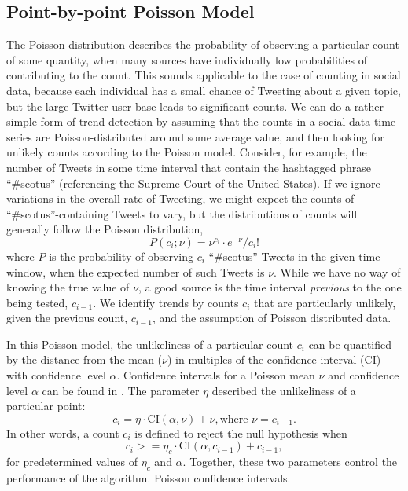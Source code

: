 \documentclass{article}
\begin{document}
\subsection{Point-by-point Poisson Model}
\label{pbppm}

The Poisson distribution describes the probability of observing a particular
count of some quantity, when many sources have individually low probabilities
of contributing to the count. This sounds applicable to the case of counting in
social data, because each individual has a small chance of Tweeting about a
given topic, but the large Twitter user base leads to significant counts. We
can do a rather simple form of trend detection by assuming that the counts in a
social data time series are Poisson-distributed around some average value, and
then looking for unlikely counts according to the Poisson model. Consider, for example,
the number of Tweets in some time interval that contain the hashtagged phrase ``\#scotus''
(referencing the Supreme Court of the United States).
If we ignore variations in the overall rate of Tweeting, we might expect the
counts of ``\#scotus''-containing Tweets to vary, but the distributions of counts
will generally follow the Poisson distribution,
\begin{equation}
    P(c_i;\nu) = \nu^{c_i}\cdot e^{-\nu} / c_i!
\end{equation}
where $P$ is the probability of observing $c_i$ ``\#scotus'' Tweets in the given time
window, when the expected number of such Tweets is $\nu$. While we have no way of
knowing the true value of $\nu$, a good source is the time interval \textit{previous} to the
one being tested, $c_{i-1}$. We identify trends by counts $c_i$ that are particularly
unlikely, given the previous count, $c_{i-1}$, and the assumption of Poisson
distributed data. 

In this Poisson model, the unlikeliness of a particular count $c_i$ can be
quantified by the distance from the mean ($\nu$) in multiples of the confidence 
interval (CI) with confidence level $\alpha$. Confidence intervals for a Poisson mean $\nu$ and
confidence level $\alpha$ can be found in \cite{George:2012}. 
The parameter $\eta$ described the unlikeliness of a particular point:
\begin{equation}
    c_i = \eta \cdot \textrm{CI}(\alpha, \nu) + \nu, \textrm{where } \nu = c_{i-1}.
\end{equation}
In other words, a count $c_i$ is defined to
reject the null hypothesis when
\begin{equation}
    c_i >= \eta_c \cdot \textrm{CI}(\alpha, c_{i-1}) + c_{i-1},
\end{equation}
for predetermined values of $\eta_c$ and $\alpha$. Together, these two parameters
control the performance of the algorithm. 
Poisson confidence intervals. 
\end{document}
